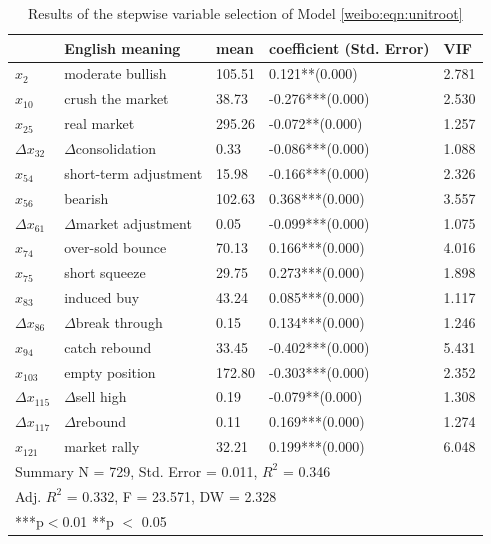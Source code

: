 \documentclass[review,3p,times,12pt,number]{elsarticle}
\begin{document}
\begin{table}[htbp]
\caption{Results of the stepwise variable selection of Model \ref{weibo:eqn:unitroot}}
\label{tab:open-variable-selection}
\center
\footnotesize
\begin{tabular} {l l l p{4cm} l}
\hline
 & English meaning & mean & coefficient (Std. Error) & VIF\\
\hline
$x_2$            &moderate bullish	      &105.51	&0.121**(0.000)	    &2.781\\
$x_{10}$         &crush the market	      &38.73	&-0.276***(0.000)	&2.530\\
$x_{25}$         &real market	              &295.26	&-0.072**(0.000)	&1.257\\
$\Delta x_{32}$  &$\Delta$consolidation     &0.33	    &-0.086***(0.000)	&1.088\\
$x_{54}$         &short-term adjustment	  &15.98	&-0.166***(0.000)	&2.326\\
$x_{56}$         &bearish                   &102.63	&0.368***(0.000)	&3.557\\
$\Delta x_{61}$  &$\Delta$market adjustment &0.05	    &-0.099***(0.000)	&1.075\\
$x_{74}$         &over-sold bounce	      &70.13	&0.166***(0.000)	&4.016\\
$x_{75}$         &short squeeze	          &29.75	&0.273***(0.000)	&1.898\\
$x_{83}$         &induced buy	              &43.24	&0.085***(0.000)	&1.117\\
$\Delta x_{86}$  &$\Delta$break through      &0.15	    &0.134***(0.000)	&1.246\\
$x_{94}$         &catch rebound	          &33.45	&-0.402***(0.000)	&5.431\\
$x_{103}$        &empty position	          &172.80	&-0.303***(0.000)	&2.352\\
$\Delta x_{115}$ &$\Delta$sell high         &0.19	    &-0.079**(0.000)	&1.308\\
$\Delta x_{117}$ &$\Delta$rebound           &0.11	    &0.169***(0.000)	&1.274\\
$x_{121}$        &market rally	          &32.21	&0.199***(0.000)	&6.048\\
\hline
\multicolumn{5}{l}{Summary N = 729, Std. Error = 0.011, $R^2$ = 0.346}\\
\multicolumn{5}{l}{\quad\quad\quad\quad Adj. $R^2$ = 0.332, F = 23.571, DW = 2.328} \\
\hline
\multicolumn{5}{l}{***p$<$0.01 **p $<$ 0.05}
\end{tabular}
\end{table}
\end{document}
